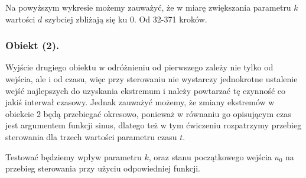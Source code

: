 \documentclass[a4paper,10pt]{article}
\begin{document}
Na powyższym wykresie możemy zauważyć, że w miarę zwiększania parametru $k$ wartości $d$ szybciej zbliżają się ku $0$. Od 32-371 kroków.

\newpage
\subsubsection{Obiekt (2).}

Wyjście drugiego obiektu w odróżnieniu od pierwszego zależy nie tylko od wejścia, ale i od czasu, więc przy sterowaniu nie wystarczy jednokrotne ustalenie wejść najlepszych do uzyskania ekstremum i należy powtarzać tę czynność co jakiś interwał czasowy. Jednak zauważyć możemy, że zmiany ekstremów w obiekcie 2 będą przebiegać okresowo, ponieważ w równaniu go opisującym czas jest argumentem funkcji sinus, dlatego też w tym ćwiczeniu rozpatrzymy przebieg sterowania dla trzech wartości parametru czasu $t$.

Testować będziemy wpływ parametru $k$, oraz stanu początkowego wejścia $u_0$ na przebieg sterowania przy użyciu odpowiedniej funkcji.

\end{document}
